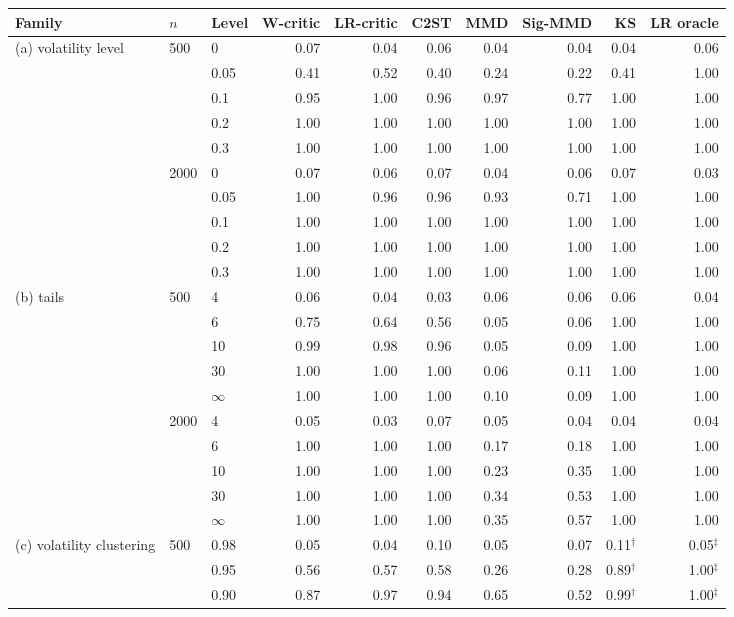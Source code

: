 \begin{tabular}{lllrrrrrrr}
\toprule
Family & $n$ & Level & W-critic & LR-critic & C2ST & MMD & Sig-MMD & KS & LR oracle \\
\midrule
(a) volatility level & 500 & 0 & 0.07 & 0.04 & 0.06 & 0.04 & 0.04 & 0.04 & 0.06 \\
 &  & 0.05 & 0.41 & 0.52 & 0.40 & 0.24 & 0.22 & 0.41 & 1.00 \\
 &  & 0.1 & 0.95 & 1.00 & 0.96 & 0.97 & 0.77 & 1.00 & 1.00 \\
 &  & 0.2 & 1.00 & 1.00 & 1.00 & 1.00 & 1.00 & 1.00 & 1.00 \\
 &  & 0.3 & 1.00 & 1.00 & 1.00 & 1.00 & 1.00 & 1.00 & 1.00 \\
 & 2000 & 0 & 0.07 & 0.06 & 0.07 & 0.04 & 0.06 & 0.07 & 0.03 \\
 &  & 0.05 & 1.00 & 0.96 & 0.96 & 0.93 & 0.71 & 1.00 & 1.00 \\
 &  & 0.1 & 1.00 & 1.00 & 1.00 & 1.00 & 1.00 & 1.00 & 1.00 \\
 &  & 0.2 & 1.00 & 1.00 & 1.00 & 1.00 & 1.00 & 1.00 & 1.00 \\
 &  & 0.3 & 1.00 & 1.00 & 1.00 & 1.00 & 1.00 & 1.00 & 1.00 \\
(b) tails & 500 & 4 & 0.06 & 0.04 & 0.03 & 0.06 & 0.06 & 0.06 & 0.04 \\
 &  & 6 & 0.75 & 0.64 & 0.56 & 0.05 & 0.06 & 1.00 & 1.00 \\
 &  & 10 & 0.99 & 0.98 & 0.96 & 0.05 & 0.09 & 1.00 & 1.00 \\
 &  & 30 & 1.00 & 1.00 & 1.00 & 0.06 & 0.11 & 1.00 & 1.00 \\
 &  & $\infty$ & 1.00 & 1.00 & 1.00 & 0.10 & 0.09 & 1.00 & 1.00 \\
 & 2000 & 4 & 0.05 & 0.03 & 0.07 & 0.05 & 0.04 & 0.04 & 0.04 \\
 &  & 6 & 1.00 & 1.00 & 1.00 & 0.17 & 0.18 & 1.00 & 1.00 \\
 &  & 10 & 1.00 & 1.00 & 1.00 & 0.23 & 0.35 & 1.00 & 1.00 \\
 &  & 30 & 1.00 & 1.00 & 1.00 & 0.34 & 0.53 & 1.00 & 1.00 \\
 &  & $\infty$ & 1.00 & 1.00 & 1.00 & 0.35 & 0.57 & 1.00 & 1.00 \\
(c) volatility clustering & 500 & 0.98 & 0.05 & 0.04 & 0.10 & 0.05 & 0.07 & 0.11$^{\dagger}$ & 0.05$^{\ddagger}$ \\
 &  & 0.95 & 0.56 & 0.57 & 0.58 & 0.26 & 0.28 & 0.89$^{\dagger}$ & 1.00$^{\ddagger}$ \\
 &  & 0.90 & 0.87 & 0.97 & 0.94 & 0.65 & 0.52 & 0.99$^{\dagger}$ & 1.00$^{\ddagger}$ \\

\end{tabular}
